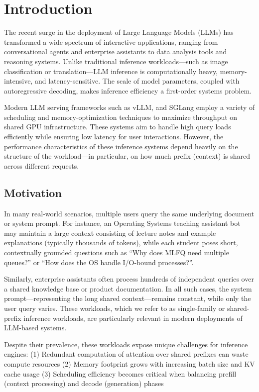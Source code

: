 \chapter{Introduction}
\begingroup
\linespread{0.95}\selectfont
The recent surge in the deployment of Large Language Models (LLMs) has transformed a wide spectrum of interactive applications, ranging from conversational agents and enterprise assistants to data analysis tools and reasoning systems. Unlike traditional inference workloads—such as image classification or translation—LLM inference is computationally heavy, memory-intensive, and latency-sensitive. The scale of model parameters, coupled with autoregressive decoding, makes inference efficiency a first-order systems problem.

Modern LLM serving frameworks such as vLLM, and SGLang employ a variety of scheduling and memory-optimization techniques to maximize throughput on shared GPU infrastructure. These systems aim to handle high query loads efficiently while ensuring low latency for user interactions. However, the performance characteristics of these inference systems depend heavily on the structure of the workload—in particular, on how much prefix (context) is shared across different requests.

\section{Motivation}
In many real-world scenarios, multiple users query the same underlying document or system prompt. For instance, an Operating Systems teaching assistant bot may maintain a large context consisting of lecture notes and example explanations (typically thousands of tokens), while each student poses short, contextually grounded questions such as ``Why does MLFQ need multiple queues?'' or ``How does the OS handle I/O-bound processes?''.

Similarly, enterprise assistants often process hundreds of independent queries over a shared knowledge base or product documentation. In all such cases, the system prompt—representing the long shared context—remains constant, while only the user query varies. These workloads, which we refer to as single-family or shared-prefix inference workloads, are particularly relevant in modern deployments of LLM-based systems.

Despite their prevalence, these workloads expose unique challenges for inference engines:
(1) Redundant computation of attention over shared prefixes can waste compute resources
(2) Memory footprint grows with increasing batch size and KV cache usage
(3) Scheduling efficiency becomes critical when balancing prefill (context processing) and decode (generation) phases

